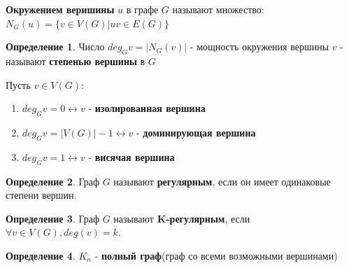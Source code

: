 \documentclass[a4paper, 12pt]{article}
\theoremstyle{definition}
\newtheorem*{definition*}{Определение}
\theoremstyle{definition}
\begin{document}
    \textbf{Окружением веришины} $u$ в графе $G$ называют множество: $N_G(u)=\{v\in V(G)|uv\in E(G)\}$

    \begin{definition*}
      Число $deg_Gv=|N_G(v)|$ - мощность окружения вершины $v$ - называют \textbf{степенью вершины} в $G$
    \end{definition*}

    Пусть $v\in V(G)$:
    \begin{enumerate}
      \item $deg_Gv=0\leftrightarrow v$ - \textbf{изолированная вершина}
      \item $deg_Gv=|V(G)|-1\leftrightarrow v$ - \textbf{доминирующая вершина}
      \item $deg_Gv=1\leftrightarrow v$ - \textbf{висячая вершина}
    \end{enumerate}

    \begin{definition*}
      Граф $G$ называют \textbf{регулярным}, если он имеет одинаковые степени вершин.
    \end{definition*}
    \begin{definition*}
      Граф $G$ называют \textbf{K-регулярным}, если $\forall v\in V(G),deg(v)=k$.
    \end{definition*}
    \begin{definition*}
      $K_n$ - \textbf{полный граф}(граф со всеми возможными вершинами)
    \end{definition*}
\end{document}
